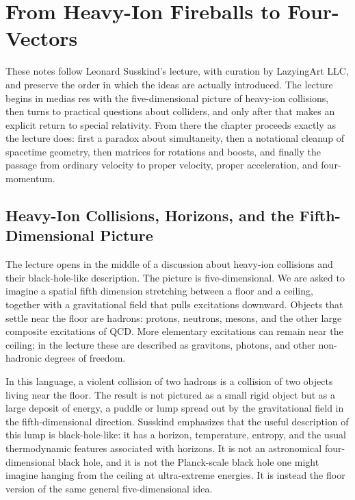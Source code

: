 \chapter{From Heavy-Ion Fireballs to Four-Vectors}

These notes follow Leonard Susskind's lecture, with curation by LazyingArt LLC, and preserve the order in which the ideas are actually introduced. The lecture begins in medias res with the five-dimensional picture of heavy-ion collisions, then turns to practical questions about colliders, and only after that makes an explicit return to special relativity. From there the chapter proceeds exactly as the lecture does: first a paradox about simultaneity, then a notational cleanup of spacetime geometry, then matrices for rotations and boosts, and finally the passage from ordinary velocity to proper velocity, proper acceleration, and four-momentum.

\section{Heavy-Ion Collisions, Horizons, and the Fifth-Dimensional Picture}

The lecture opens in the middle of a discussion about heavy-ion collisions and their black-hole-like description. The picture is five-dimensional. We are asked to imagine a spatial fifth dimension stretching between a floor and a ceiling, together with a gravitational field that pulls excitations downward. Objects that settle near the floor are hadrons: protons, neutrons, mesons, and the other large composite excitations of QCD. More elementary excitations can remain near the ceiling; in the lecture these are described as gravitons, photons, and other non-hadronic degrees of freedom.

In this language, a violent collision of two hadrons is a collision of two objects living near the floor. The result is not pictured as a small rigid object but as a large deposit of energy, a puddle or lump spread out by the gravitational field in the fifth-dimensional direction. Susskind emphasizes that the useful description of this lump is black-hole-like: it has a horizon, temperature, entropy, and the usual thermodynamic features associated with horizons. It is not an astronomical four-dimensional black hole, and it is not the Planck-scale black hole one might imagine hanging from the ceiling at ultra-extreme energies. It is instead the floor version of the same general five-dimensional idea.

